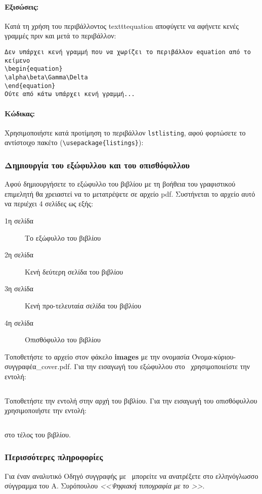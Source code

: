 \begin{refsection}
\paragraph{Εξισώσεις:}
Κατά τη χρήση του περιβάλλοντος texttt{equation} αποφύγετε να αφήνετε κενές γραμμές πριν και
μετά το περιβάλλον:
\begin{verbatim}
Δεν υπάρχει κενή γραμμή που να χωρίζει το περιβάλλον equation από το κείμενο
\begin{equation}
\alpha\beta\Gamma\Delta
\end{equation}
Ούτε από κάτω υπάρχει κενή γραμμή...
\end{verbatim}
\paragraph{Κώδικας:}
Χρησιμοποιήστε κατά προτίμηση το περιβάλλον \texttt{lstlisting}, αφού φορτώσετε το αντίστοιχο πακέτο (\verb|\usepackage{listings}|):

\subsubsection{Δημιουργία του εξώφυλλου και του οπισθόφυλλου}
Αφού δημιουργήσετε το εξώφυλλο του βιβλίου με τη βοήθεια του γραφιστικού επιμελητή θα χρειαστεί να το
μετατρέψετε σε αρχείο pdf. Συστήνεται το αρχείο αυτό να περιέχει 4 σελίδες ως εξής:
\begin{description}
\item [1η σελίδα] Το εξώφυλλο του βιβλίου
\item [2η σελίδα] Κενή δεύτερη σελίδα του βιβλίου
\item [3η σελίδα] Κενή προ-τελευταία σελίδα του βιβλίου
\item [4η σελίδα] Οπισθόφυλλο του βιβλίου
\end{description}
Τοποθετήστε το αρχείο στον φάκελο \textbf{images} με την ονομασία Όνομα-κύριου-συγγραφέα\_cover.pdf. Για την εισαγωγή του εξώφυλλου στο \XeLaTeX\ χρησιμοποιείστε την εντολή:
\begin{verbatim}

\end{verbatim}
Τοποθετήστε την εντολή στην αρχή του βιβλίου.
Για την εισαγωγή του οπισθόφυλλου χρησιμοποιήστε την εντολή:
\begin{verbatim}

\end{verbatim}
στο τέλος του βιβλίου.

\subsubsection{Περισσότερες πληροφορίες}
Για έναν αναλυτικό Οδηγό συγγραφής με \XeLaTeX\ μπορείτε να ανατρέξετε στο ελληνόγλωσσο σύγγραμμα του
Α. Συρόπουλου \textit{<<Ψηφιακή τυπογραφία με το \XeLaTeX>>}\cite{asyro}.

\printbibliography[heading=biboption]
\end{refsection}
